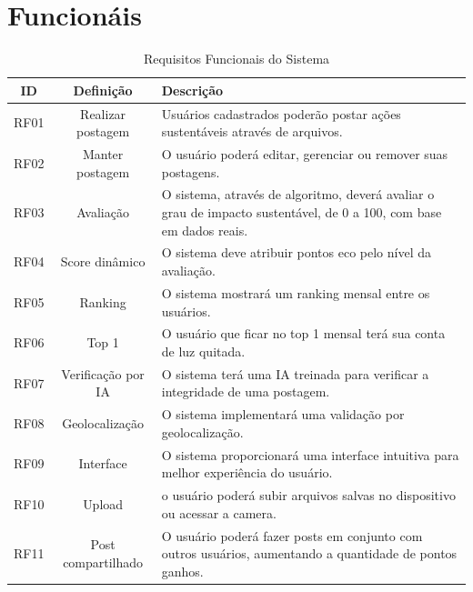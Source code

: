 \documentclass[
  12pt,
  a4paper,
  oneside,
  chapter=TITLE,
  section=TITLE,
  brazil
]{abntex2}
\begin{document}
\section{Funcionáis}
\begin{table}[h!]
\centering
\begin{tabular}{|c|c|p{8cm}|}
\hline
\textbf{ID} & \textbf{Definição} & \textbf{Descrição} \\
\hline
RF01 & Realizar postagem & Usuários cadastrados poderão postar ações sustentáveis através de arquivos. \\
\hline
RF02 & Manter postagem & O usuário poderá editar, gerenciar ou remover suas postagens. \\
\hline
RF03 & Avaliação & O sistema, através de algoritmo, deverá avaliar o grau de impacto sustentável, de 0 a 100, com base em dados reais. \\
\hline
RF04 & Score dinâmico & O sistema deve atribuir pontos eco pelo nível da avaliação. \\
\hline
RF05 & Ranking & O sistema mostrará um ranking mensal entre os usuários. \\
\hline
RF06 & Top 1 & O usuário que ficar no top 1 mensal terá sua conta de luz quitada. \\
\hline
RF07 & Verificação por IA & O sistema terá uma IA treinada para verificar a integridade de uma postagem. \\
\hline
RF08 & Geolocalização & O sistema implementará uma validação por geolocalização. \\
\hline
RF09 & Interface & O sistema proporcionará uma interface intuitiva para melhor experiência do usuário. \\
\hline
RF10 & Upload & o usuário poderá subir arquivos salvas no dispositivo ou acessar a camera. \\
\hline
RF11 & Post compartilhado & O usuário poderá fazer posts em conjunto com outros usuários, aumentando a quantidade de pontos ganhos. \\
\hline
\end{tabular}
\caption{Requisitos Funcionais do Sistema}
\label{tab:requisitos_funcionais}
\end{table}

\newpage
\end{document}
